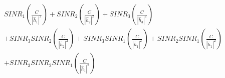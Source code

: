 \documentclass[preview]{standalone}
\begin{document}
\begin{align*}
SINR_1 \left( \frac{C}{\left|{\hat{h}_1}\right|^2} \right) + SINR_2 \left( \frac{C}{\left|{\hat{h}_2}\right|^2} \right) + SINR_3 \left( \frac{C}{\left|{\hat{h}_3}\right|^2} \right) \\ + SINR_3 SINR_2 \left( \frac{C}{\left|{\hat{h}_2}\right|^2} \right) + SINR_3 SINR_1 \left( \frac{C}{\left|{\hat{h}_1}\right|^2} \right) + SINR_2 SINR_1 \left( \frac{C}{\left|{\hat{h}_1}\right|^2} \right) \\ + SINR_3 SINR_2 SINR_1 \left( \frac{C}{\left|{\hat{h}_1}\right|^2} \right)
\end{align*}
\end{document}
